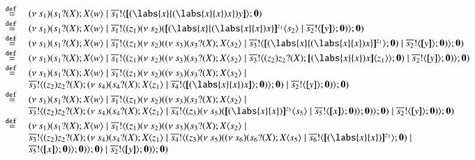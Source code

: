 \[
\begin{array}{ll}
	\defeq&
	\newsp{s_1}{ \binp{s_1}{X} \appl{X}{w} \Par \bout{\dual{s_1}}{\map{(\labs{x}{(\labs{x}{x})x}) y }} \inact}\\
	\defeq&
	\newsp{s_1}{ \binp{s_1}{X} \appl{X}{w} \Par \bout{\dual{s_1}}{\abs{z_1}{\newsp{s_2}{\appl{\map{(\labs{x}{(\labs{x}{x})x}}^{z_1}}{s_2} \Par \bout{\dual{s_2}}{\map{y}}\inact }}} \inact}\\
	\defeq&
	\newsp{s_1}{ \binp{s_1}{X} \appl{X}{w} \Par \bout{\dual{s_1}}{\abs{z_1}{\newsp{s_2}{\newsp{s_3}{ \binp{s_3}{X} \appl{X}{s_2} \Par \bout{\dual{s_3}}{\map{(\labs{x}{(\labs{x}{x})x}}^{z_1}} \inact} \Par \bout{\dual{s_2}}{\map{y}}\inact }}} \inact}\\
	\defeq&
	\newsp{s_1}{ \binp{s_1}{X} \appl{X}{w} \Par \bout{\dual{s_1}}{\abs{z_1}{\newsp{s_2}{\newsp{s_3}{ \binp{s_3}{X} \appl{X}{s_2} \Par \bout{\dual{s_3}}{\abs{z_2}{\binp{z_2}{X} \appl{\map{(\labs{x}{x})x}}{z_1}}} \inact} \Par \bout{\dual{s_2}}{\map{y}}\inact }}} \inact}\\
	\defeq&
	\newsp{s_1}{ \binp{s_1}{X} \appl{X}{w} \Par \bout{\dual{s_1}}{\abs{z_1}{\newsp{s_2}{\newsp{s_3}{ \binp{s_3}{X} \appl{X}{s_2} \Par \\
	& \bout{\dual{s_3}}{\abs{z_2}{\binp{z_2}{X} \newsp{s_4}{ \binp{s_4}{X} \appl{X}{z_1} \Par \bout{\dual{s_4}}{\map{(\labs{x}{x})x}} \inact}}} \inact} \Par \bout{\dual{s_2}}{\map{y}}\inact }}} \inact}
	\\
	\defeq&
	\newsp{s_1}{ \binp{s_1}{X} \appl{X}{w} \Par \bout{\dual{s_1}}{\abs{z_1}{\newsp{s_2}{\newsp{s_3}{ \binp{s_3}{X} \appl{X}{s_2} \Par \\
	& \bout{\dual{s_3}}{\abs{z_2}{\binp{z_2}{X} \newsp{s_4}{ \binp{s_4}{X} \appl{X}{z_1} \Par \bout{\dual{s_4}}{\abs{z_3}{\newsp{s_5}{ \appl{\map{(\labs{x}{x})}^{z_3}}{s_5} \Par \bout{\dual{s_5}}{\map{x}} \inact }}} \inact}}} \inact} \Par \bout{\dual{s_2}}{\map{y}}\inact }}} \inact}\\
	\defeq&
	\newsp{s_1}{ \binp{s_1}{X} \appl{X}{w} \Par \bout{\dual{s_1}}{\abs{z_1}{\newsp{s_2}{\newsp{s_3}{ \binp{s_3}{X} \appl{X}{s_2} \Par \\
	& \bout{\dual{s_3}}{\abs{z_2}{\binp{z_2}{X} \newsp{s_4}{ \binp{s_4}{X} \appl{X}{z_1} \Par \bout{\dual{s_4}}{\abs{z_3}{\newsp{s_5}{ \newsp{s_6}{ \binp{s_6}{X} \appl{X}{s_5} \Par \bout{\dual{s_6}}{\map{(\labs{x}{x})}^{z_3}} \inact} \Par\\
	&\bout{\dual{s_5}}{\map{x}} \inact }}} \inact}}} \inact} \Par \bout{\dual{s_2}}{\map{y}}\inact }}} \inact}\\

\end{array}\]
